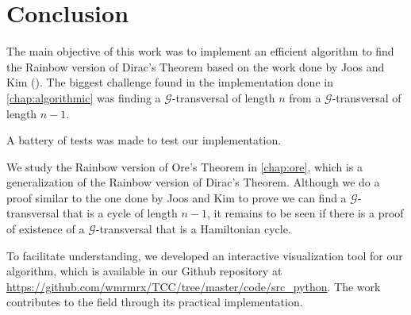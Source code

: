 
\chapter{Conclusion}

The main objective of this work was to implement an efficient algorithm to find
the Rainbow version of Dirac's Theorem based on the work done by Joos and Kim (\cite{Joos_2020}).
The biggest challenge found in the implementation done in \autoref{chap:algorithmic} was 
finding a $\mathcal{G}$-transversal of length $n$ from a $\mathcal{G}$-transversal of length $n - 1$.

A battery of tests was made to test our implementation.

We study the Rainbow version of Ore's Theorem in \autoref{chap:ore}, which is a generalization of
the Rainbow version of Dirac's Theorem. Although we do a proof similar
to the one done by Joos and Kim to prove we can find a 
$ \mathcal{G} $-transversal that is a cycle of length $ n - 1 $, it remains
to be seen if there is a proof of existence of a 
$ \mathcal{G} $-transversal that is a Hamiltonian cycle.

To facilitate understanding, we developed 
an interactive visualization tool for our algorithm, which is available in 
our Github repository at \url{https://github.com/wmrmrx/TCC/tree/master/code/src_python}.
The work contributes to the field through its practical implementation.
